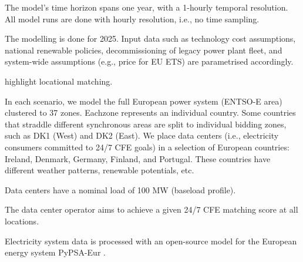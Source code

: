 The model's time horizon spans one year, with a 1-hourly temporal resolution.
All model runs are done with hourly resolution, i.e., no time sampling.

The modelling is done for 2025. Input data such as technology cost assumptions, national renewable policies, decommissioning of legacy power plant fleet, and
system-wide assumptions (e.g., price for EU ETS) are parametrised accordingly.

highlight locational matching.

In each scenario, we model the full European power system (ENTSO-E area) clustered to 37 zones. Eachzone represents an individual country. Some countries that straddle different synchronous areas are split to individual bidding zones, such as DK1 (West) and DK2 (East). We place data centers (i.e., electricity consumers committed to 24/7 CFE goals) in a selection of European countries: Ireland, Denmark, Germany, Finland, and Portugal. These countries have different weather patterns, renewable potentials, etc.

Data centers have a nominal load of 100 MW (baseload profile).

The data center operator aims to achieve a given 24/7 CFE matching score at all locations.

Electricity system data is processed with an open-source model for the European energy system PyPSA-Eur \cite{PyPSAEur-docs}.
